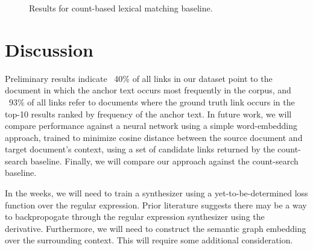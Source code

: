 \documentclass{article}
\begin{document}
\begin{figure}[H]
\centering
{}
\caption{Results for count-based lexical matching baseline.}
\label{fig:baseline_comparison}
\end{figure}

\section{Discussion}

Preliminary results indicate ~40\% of all links in our dataset point to the document in which the anchor text occurs most frequently in the corpus, and ~93\% of all links refer to documents where the ground truth link occurs in the top-10 results ranked by frequency of the anchor text. In future work, we will compare performance against a neural network using a simple word-embedding approach, trained to minimize cosine distance between the source document and target document's context, using a set of candidate links returned by the count-search baseline. Finally, we will compare our approach against the count-search baseline.

In the weeks, we will need to train a synthesizer using a yet-to-be-determined loss function over the regular expression. Prior literature suggests there may be a way to backpropogate through the regular expression synthesizer using the ~\citet{brzozowski1964derivatives} derivative. Furthermore, we will need to construct the semantic graph embedding over the surrounding context. This will require some additional consideration.

\clearpage
\newpage



\end{document}
